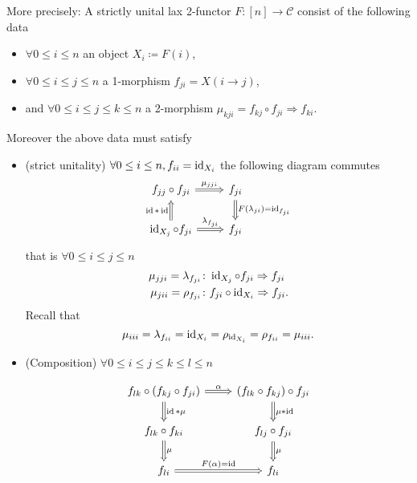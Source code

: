 \begin{rmk}
\begin{itemize}
	\end{itemize} 

	More precisely:
	A strictly unital lax 2-functor $ F \colon [ n ] \to \mathcal{ C } $ consist of the following data
	\begin{itemize}
		\item 	
		 $ \forall 0 \leq i \leq n $ an object $ X_i \coloneqq F ( i ) $,
		
		\item   
		$ \forall 0 \leq i \leq j \leq n $ a 1-morphism $ f_{ j i } = X ( i \to j ) $,
		
		\item 
		and $ \forall 0 \leq i \leq j \leq k \leq n $ a 2-morphism $ \mu_{ k j i } = f_{ k j } \circ f_{ j i } \Rightarrow f_{ k i } $.
	\end{itemize}

	Moreover the above data must satisfy
	
	\begin{itemize}
		\item 
		(strict unitality) $ \forall 0 \leq i \leq n , f_{ i i } = \operatorname{id}_{ X_i } $ the following diagram commutes
		\[
		\begin{tikzcd}
			f_{ j j } \circ f_{ j i }
			\ar[r, Rightarrow, "\mu_{ j j i }"]
			&
			f_{ j i }
			\ar[d, Rightarrow, " F ( \lambda_{ j i } ) = \id_{ f_{ j i } }"]
			\\
			\id_{ X_j } \circ f_{ j i }
			\ar[u, Rightarrow, "\id * \id"]
			\ar[r, Rightarrow, "\lambda_{ f_{ ji } } "]
			&
			f_{ j i }
		\end{tikzcd}
		\]
		that is $ \forall 0 \leq i \leq j \leq n $ 
		\begin{align*}
			\mu_{ j j i } = \lambda_{ f_{ j i } } 
			&\colon
			\operatorname{id}_{ X_j } \circ f_{ j i } \Rightarrow f_{ j i }
			\\
			\mu_{ j i i } = \rho_{ f_{ j i } } 
			&\colon 
			f_{ j i } \circ \operatorname{id}_{ X_i } \Rightarrow f_{ j i }.
		\end{align*}
		Recall that 
		\[
			\mu_{ i i i } = \lambda_{ f_{ i i } } = \operatorname{id}_{ X_i } = \rho_{ \operatorname{id}_ { X_i } } = \rho_{ f_{ i i } } = \mu_{ i i i }.
		\] 
		
		\item 
		(Composition)
		$ \forall 0 \leq i \leq j \leq k \leq l \leq n $
		
		\begin{equation}
		\label{eq:1}
		\begin{tikzcd}
			f_{lk} \circ ( f_{kj} \circ f_{ji} )
			\ar[r, Rightarrow, "\alpha"]
			\ar[d, Rightarrow, " \id * \mu"]
			&
			( f_{lk} \circ f_{kj} ) \circ f_{ji}
			\ar[d, Rightarrow, "\mu*\id"]
			\\
			f_{lk} \circ f_{ki}
			\ar[d, Rightarrow," \mu "]
			&
			f_{lj} \circ f_{ji}
			\ar[d, Rightarrow, " \mu "]
			\\
			f_{li}
			\ar[r, Rightarrow, " F ( \alpha ) = \id "]
			&
			f_{li}
		\end{tikzcd}
		\end{equation}
	\end{itemize}
\end{rmk}

